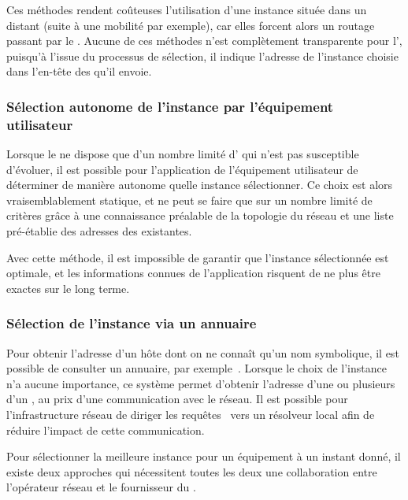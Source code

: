 \documentclass[../main.tex]{subfiles}
\begin{document}
Ces méthodes rendent coûteuses l’utilisation d’une instance située dans un  distant (suite à une mobilité par exemple), car elles forcent alors un routage passant par le .
Aucune de ces méthodes n’est complètement transparente pour l’, puisqu’à l’issue du processus de sélection, il indique l’adresse de l’instance choisie dans l’en-tête des  qu’il envoie.

\subsubsection{Sélection autonome de l’instance par l’équipement utilisateur}
Lorsque le  ne dispose que d’un nombre limité d’ qui n’est pas susceptible d’évoluer, il est possible pour l’application de l’équipement utilisateur de déterminer de manière autonome quelle instance sélectionner.
Ce choix est alors vraisemblablement statique, et ne peut se faire que sur un nombre limité de critères grâce à une connaissance préalable de la topologie du réseau et une liste pré-établie des adresses des  existantes.

Avec cette méthode, il est impossible de garantir que l’instance sélectionnée est optimale, et les informations connues de l’application risquent de ne plus être exactes sur le long terme.

\pagebreak
\subsubsection{Sélection de l’instance via un annuaire}
Pour obtenir l’adresse d’un hôte dont on ne connaît qu’un nom symbolique, il est possible de consulter un annuaire, par exemple~.
Lorsque le choix de l’instance n’a aucune importance, ce système permet d’obtenir l’adresse d’une ou plusieurs  d’un , au prix d’une communication avec le réseau.
Il est possible pour l’infrastructure réseau de diriger les requêtes~ vers un résolveur local afin de réduire l’impact de cette communication.

Pour sélectionner la meilleure instance pour un équipement à un instant donné, il existe deux approches qui nécessitent toutes les deux une collaboration entre l’opérateur réseau et le fournisseur du .
\end{document}
